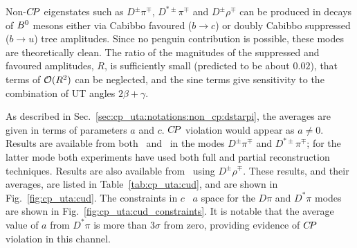 Non-$C\!P$ eigenstates such as $D^\pm\pi^\mp$, $D^{*\pm}\pi^\mp$ and $D^\pm\rho^\mp$ can be produced 
in decays of $B^0$ mesons either via Cabibbo favoured ($b \to c$) or
doubly Cabibbo suppressed ($b \to u$) tree amplitudes. 
Since no penguin contribution is possible,
these modes are theoretically clean.
The ratio of the magnitudes of the suppressed and favoured amplitudes, $R$,
is sufficiently small (predicted to be about $0.02$),
that terms of ${\cal O}(R^2)$ can be neglected, 
and the sine terms give sensitivity to the combination of UT angles $2\beta+\gamma$.

As described in Sec.~\ref{sec:cp_uta:notations:non_cp:dstarpi},
the averages are given in terms of parameters $a$ and $c$.
$C\!P$ violation would appear as $a \neq 0$.
Results are available from both \babar\ and \belle\ in the modes
$D^\pm\pi^\mp$ and $D^{*\pm}\pi^\mp$; for the latter mode both experiments 
have used both full and partial reconstruction techniques.
Results are also available from \babar\ using $D^\pm\rho^\mp$.
These results, and their averages, are listed in Table~\ref{tab:cp_uta:cud},
and are shown in Fig.~\ref{fig:cp_uta:cud}.
The constraints in $c$ \vs\ $a$ space for the $D\pi$ and $D^*\pi$ modes
are shown in Fig.~\ref{fig:cp_uta:cud_constraints}.
It is notable that the average value of $a$ from $D^*\pi$ is more than
$3\sigma$ from zero, providing evidence of $C\!P$ violation in this channel.



